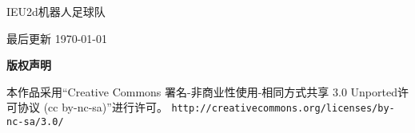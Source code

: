 \thispagestyle{plain}
\begin{center}
  {\LARGE\textbf{\BookTitle}}

  \vspace{1em}
  {\large IEU2d机器人足球队 }

  \vspace{1ex}
  最后更新 \today
  
  \vspace{1em}
  \textbf{\large 版权声明}
\end{center}

\noindent 本作品采用“Creative Commons 署名-非商业性使用-相同方式共享 3.0 Unported许可协议 
(cc by-nc-sa)”进行许可。
\texttt{\small http://creativecommons.org/licenses/by-nc-sa/3.0/}

\vspace{1em}


